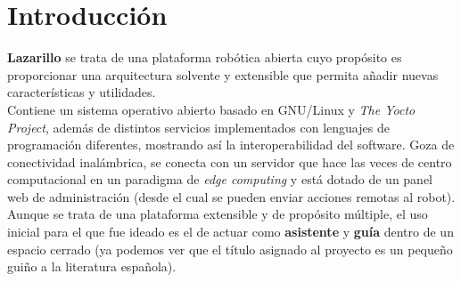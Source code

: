 \chapter*{Introducción}

\textbf{Lazarillo} se trata de una plataforma robótica abierta cuyo propósito es proporcionar una arquitectura solvente y extensible que permita añadir nuevas características y utilidades.\\

Contiene un sistema operativo abierto basado en GNU/Linux y \textit{The Yocto Project}, además de distintos servicios implementados con lenguajes de programación diferentes, mostrando así la interoperabilidad del software. Goza de conectividad inalámbrica, se conecta con un servidor que hace las veces de centro computacional en un paradigma de \textit{edge computing} y está dotado de un panel web de administración (desde el cual se pueden enviar acciones remotas al robot).\\

Aunque se trata de una plataforma extensible y de propósito múltiple, el uso inicial para el que fue ideado es el de actuar como \textbf{asistente} y \textbf{guía} dentro de un espacio cerrado (ya podemos ver que el título asignado al proyecto es un pequeño guiño a la literatura española).
